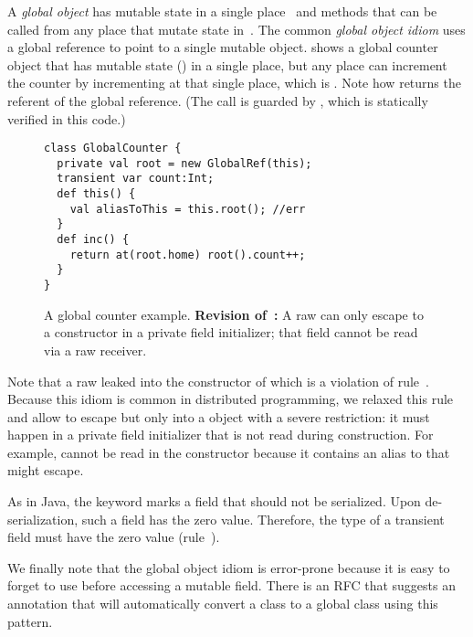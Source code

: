 {A \emph{global object} has mutable state in a single place~
    and methods that can be called from any place that mutate state in~.
The common \emph{global object idiom}
    uses a global reference
    to point to a single mutable object.
 shows a global counter object
    that has mutable state () in a single place,
    but any place can increment the counter by incrementing  at that single place,
    which is .
Note how  returns the referent of the global reference.
(The call  is guarded by , which is statically verified in this code.)



\begin{figure}
\begin{lstlisting}
class GlobalCounter {
  private val root = new GlobalRef(this);
  transient var count:Int;
  def this() {
    val aliasToThis = this.root(); //err
  }
  def inc() {
    return at(root.home) root().count++;
  }
}
\end{lstlisting}
\caption{A global counter example.
    \textbf{Revision of~:}
        A raw \this can only escape to a  constructor in a private field initializer;
            that field cannot be read via a raw \this receiver.
    }
\label{Figure:GlobalRef}
\end{figure}

Note that a raw \this leaked into the constructor of 
    which is a violation of rule~.
Because this idiom is common in distributed programming,
    we relaxed this rule and allow \this to escape but only into a  object
    with a severe restriction:
    it must happen in a private field initializer that is not read during construction.
For example,  cannot be read in the constructor
    because it contains an alias to  that might escape.

As in Java, the  keyword marks a field that should not be serialized.
Upon de-serialization, such a field has the zero value.
Therefore, the type of a transient field must have the zero value (rule~).

We finally note that the global object idiom is error-prone because
    it is easy to forget to use  before accessing a mutable field.
There is an RFC that suggests an annotation that will automatically convert a class to a global class
    using this pattern.


}


